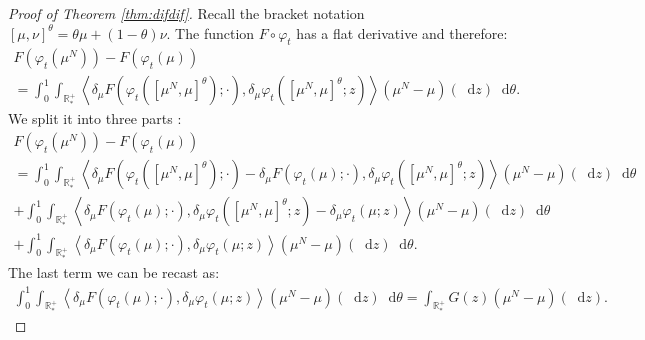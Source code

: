\documentclass[11pt,a4paper]{article}
\newcommand{\RRP}{\mathbb{R}^+_*}
\newcommand{\brac}[1]{\left\langle#1\right\rangle}
\newcommand{\dd}{\mathop{}\!\mathrm{d}}
\begin{document}
\begin{proof}[Proof of Theorem \ref{thm:difdif}]
    Recall the bracket notation $[\mu,\nu]^\theta = \theta \mu + (1-\theta)\nu$. The function $F\circ \varphi_t$ has a flat derivative and therefore:
    \begin{multline*}
        F\left(\varphi_t(\mu^N)\right) - F\left(\varphi_t(\mu)\right) \\
        = \int_0^1 \int_{\RRP} \brac{\delta_\mu F\left(\varphi_t \left(\left[\mu^N,\mu \right]^\theta\right);\cdot \right), \delta_\mu \varphi_t\left(\left[\mu^N,\mu \right]^\theta;z \right)} \left(\mu^N - \mu\right)(\dd z)\dd \theta.
    \end{multline*}
    We split it into three parts :
    \begin{multline*}
        F\left(\varphi_t(\mu^N)\right) - F\left(\varphi_t(\mu)\right) \\
        = \int_0^1 \int_{\RRP} \brac{\delta_\mu F\left(\varphi_t \left(\left[\mu^N,\mu \right]^\theta\right);\cdot \right)- \delta_\mu F\left(\varphi_t \left(\mu\right);\cdot \right), \delta_\mu \varphi_t\left(\left[\mu^N,\mu \right]^\theta;z \right)} \left(\mu^N - \mu\right)(\dd z)\dd \theta \\
        + \int_0^1 \int_{\RRP} \brac{\delta_\mu F\left(\varphi_t \left(\mu\right);\cdot \right), \delta_\mu \varphi_t\left(\left[\mu^N,\mu \right]^\theta;z \right) -  \delta_\mu \varphi_t\left(\mu;z \right)} \left(\mu^N - \mu\right)(\dd z)\dd \theta \\
        + \int_0^1 \int_{\RRP} \brac{\delta_\mu F\left(\varphi_t \left(\mu\right);\cdot \right), \delta_\mu \varphi_t\left(\mu;z \right)} \left(\mu^N - \mu\right)(\dd z)\dd \theta.
    \end{multline*}
    The last term we can be recast as:
    \begin{align*}
        \int_0^1 \int_{\RRP} \brac{\delta_\mu F\left(\varphi_t \left(\mu\right);\cdot \right), \delta_\mu \varphi_t\left(\mu;z \right)} \left(\mu^N - \mu\right)(\dd z)\dd \theta
        = \int_{\RRP}G(z) \left( \mu^N - \mu\right)(\dd z)  .
    \end{align*}


\end{proof}
\end{document}
